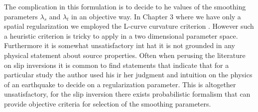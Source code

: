 The complication in this formulation is to decide to he values of the smoothing parameters $\lambda_s$ and $\lambda_t$ in an objective way. In Chapter 3 where we have only a spatial regularization we employed the L-curve curvature criterion \citep{hansen2007}. However such a heuristic criterion is tricky to apply in a two dimensional parameter space. Furthermore it is somewhat unsatisfactory int hat it is not grounded in any physical statement about source properties. Often when perusing the literature on slip inversions it is common to find statements that indicate that for a particular study the author used his ir her judgment and intuition on the physics of an earthquake to decide on a regularization parameter. This is altogether unsatisfactory, for the slip inversion there exists probabilistic formalism that can provide objective criteria for selection of the smoothing parameters.

